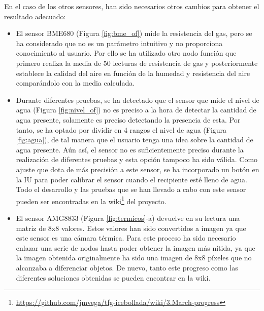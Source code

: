 En el caso de los otros sensores, han sido necesarios otros cambios para obtener el resultado adecuado:
\begin{itemize}
	\item El sensor BME680 (Figura \ref{fig:bme_of}) mide la resistencia del gas, pero se ha considerado que no es un parámetro intuitivo y no proporciona conocimiento al usuario. Por ello se ha utilizado otro nodo función que primero realiza la media de 50 lecturas de resistencia de gas y posteriormente establece la calidad del aire en función de la humedad y resistencia del aire comparándolo con la media calculada.
	
	\item Durante diferentes pruebas, se ha detectado que el sensor que mide el nivel de agua (Figura \ref{fig:nivel_of}) no es preciso a la hora de detectar la cantidad de agua presente, solamente es preciso detectando la presencia de esta. Por tanto, se ha optado por dividir en 4 rangos el nivel de agua (Figura \ref{fig:agua}), de tal manera que el usuario tenga una idea sobre la cantidad de agua presente. Aún así, el sensor no es suficientemente preciso durante la realización de diferentes pruebas y esta opción tampoco ha sido válida. Como ajuste que dota de más precisión a este sensor, se ha incorporado un botón en la IU para poder calibrar el sensor cuando el recipiente esté lleno de agua. Todo el desarrollo y las pruebas que se han llevado a cabo con este sensor pueden ser encontradas en la wiki\footnote{\url{https://github.com/jmvega/tfg-icebollada/wiki/3.March-progress}} del proyecto.
	
	\item El sensor AMG8833 (Figura \ref{fig:termicos}-a) devuelve en su lectura una matriz de 8x8 valores. Estos valores han sido convertidos a imagen ya que este sensor es una cámara térmica. Para este proceso ha sido necesario enlazar una serie de nodos hasta poder obtener la imagen más nítida, ya que la imagen obtenida originalmente ha sido una imagen de 8x8 píxeles que no alcanzaba a diferenciar objetos. De nuevo, tanto este progreso como las diferentes soluciones obtenidas se pueden encontrar en la wiki. 
\end{itemize}
